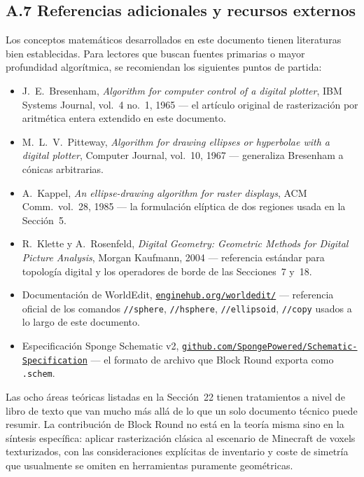 \documentclass[12pt,a4paper]{scrartcl}
\newcommand{\code}[1]{\texttt{\small #1}}
\newcommand{\cmd}[1]{\textcolor{earth}{\texttt{\small #1}}}
\newcommand{\biblink}[2]{\href{#1}{\nolinkurl{#2}}}
\begin{document}
\subsection*{A.7 Referencias adicionales y recursos externos}

Los conceptos matemáticos desarrollados en este documento tienen literaturas bien establecidas. Para lectores que buscan fuentes primarias o mayor profundidad algorítmica, se recomiendan los siguientes puntos de partida:

\begin{itemize}[leftmargin=1.4em,itemsep=0.2em,topsep=0.3em]
  \item J.~E.~Bresenham, \emph{Algorithm for computer control of a digital plotter}, IBM Systems Journal, vol.~4 no.~1, 1965 --- el artículo original de rasterización por aritmética entera extendido en este documento.
  \item M.~L.~V.~Pitteway, \emph{Algorithm for drawing ellipses or hyperbolae with a digital plotter}, Computer Journal, vol.~10, 1967 --- generaliza Bresenham a cónicas arbitrarias.
  \item A.~Kappel, \emph{An ellipse-drawing algorithm for raster displays}, ACM Comm.\ vol.~28, 1985 --- la formulación elíptica de dos regiones usada en la Sección~5.
  \item R.~Klette y A.~Rosenfeld, \emph{Digital Geometry: Geometric Methods for Digital Picture Analysis}, Morgan Kaufmann, 2004 --- referencia estándar para topología digital y los operadores de borde de las Secciones~7 y~18.
  \item Documentación de WorldEdit, \biblink{https://enginehub.org/worldedit/}{enginehub.org/worldedit/} --- referencia oficial de los comandos \cmd{//sphere}, \cmd{//hsphere}, \cmd{//ellipsoid}, \cmd{//copy} usados a lo largo de este documento.
  \item Especificación Sponge Schematic v2, \biblink{https://github.com/SpongePowered/Schematic-Specification}{github.com/SpongePowered/Schematic-Specification} --- el formato de archivo que Block Round exporta como \code{.schem}.
\end{itemize}

Las ocho áreas teóricas listadas en la Sección~22 tienen tratamientos a nivel de libro de texto que van mucho más allá de lo que un solo documento técnico puede resumir. La contribución de Block Round no está en la teoría misma sino en la síntesis específica: aplicar rasterización clásica al escenario de Minecraft de voxels texturizados, con las consideraciones explícitas de inventario y coste de simetría que usualmente se omiten en herramientas puramente geométricas.
\end{document}
